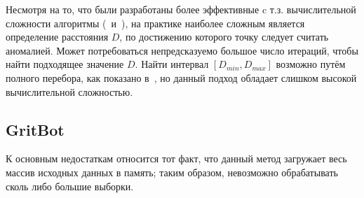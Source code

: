 Несмотря на то, что были разработаны более эффективные c т.з. вычислительной сложности алгоритмы (\cite{TaoMiningDistBasedOutliersFromLargeDB}~и~\cite{AngiulliVeryEfficientMiningDistBasedOutliers}), на практике наиболее сложным является определение расстояния $D$, по достижению которого точку следует считать аномалией. Может потребоваться непредсказуемо большое число итераций, чтобы найти подходящее значение $D$. Найти интервал $[D_{min}, D_{max}]$ возможно путём полного перебора, как показано в~\cite{RamaswamyEffAlgoMiningOutliers}, но данный подход обладает слишком высокой вычислительной сложностью.

\subsection{GritBot}
К основным недостаткам относится тот факт, что данный метод загружает весь массив исходных данных в память; таким образом, невозможно обрабатывать сколь либо большие выборки.